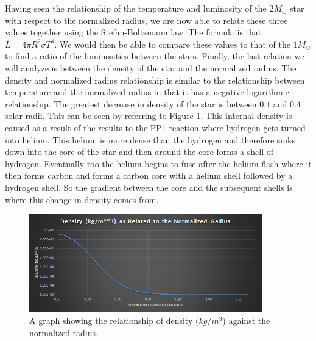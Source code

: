 \documentclass{article}
\begin{document}
\begin{multicols}{2}

Having seen the relationship of the temperature and luminosity of the $2M_\odot$ star with respect to the normalized radius, we are now able to relate these three values together using the Stefan-Boltzmann law. The formula is that $L=4\pi R^2\sigma T^4$. We would then be able to compare these values to that of the $1M_\odot$ to find a ratio of the luminosities between the stars. Finally, the last relation we will analyze is between the density of the star and the normalized radius. The density and normalized radius relationship is similar to the relationship between temperature and the normalized radius in that it has a negative logarithmic relationship. The greatest decrease in density of the star is between $0.1$ and $0.4$ solar radii. This can be seen by referring to Figure \ref{fig:dense}. This internal density is caused as a result of the results to the PP1 reaction where hydrogen gets turned into helium. This helium is more dense than the hydrogen and therefore sinks down into the core of the star and then around the core forms a shell of hydrogen. Eventually too the helium begins to fuse after the helium flash where it then forms carbon and forms a carbon core with a helium shell followed by a hydrogen shell. So the gradient between the core and the subsequent shells is where this change in density comes from.

\end{multicols}

\begin{figure}
  \centering
  \includegraphics[width=0.9\textwidth]{dense.png}
  \caption{A graph showing the relationship of density ($kg/m^3$) against the normalized radius.}
  \label{fig:dense}
\end{figure}
\end{document}
